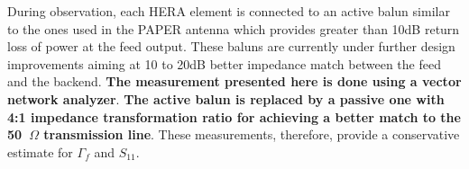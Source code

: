\documentclass[twocolumn]{emulateapj}
\begin{document}
    
    During observation, each HERA element is connected to an active balun similar
    to the ones used in the PAPER antenna which provides greater than 10dB return
    loss of power at the feed output. These baluns are currently under further design 
    improvements aiming at 10 to 20dB
    better impedance match between the feed and the backend. \textbf{The measurement presented here is done using a vector network analyzer}. \textbf{The active balun is replaced by a passive one with 4:1 impedance transformation ratio for achieving a better match to the 50~$\Omega$ transmission line}. These measurements, therefore, provide a conservative estimate for $\Gamma_{f}$ and $S_{11}$.
    
\end{document}
